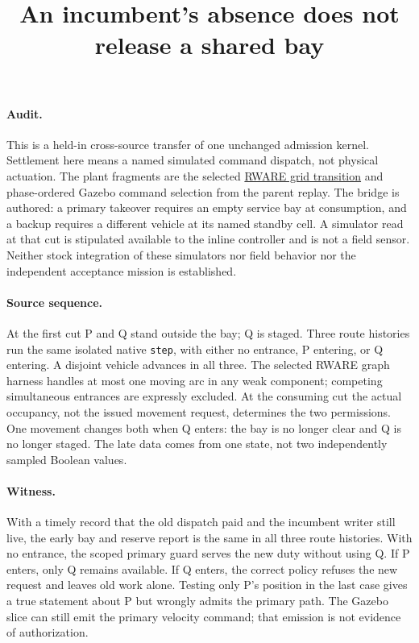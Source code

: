 \documentclass{article}
\title{An incumbent's absence does not release a shared bay}
\author{}
\date{}
\begin{document}
\maketitle
\paragraph{Audit.}
This is a held-in cross-source transfer of one unchanged admission
kernel. Settlement here means a named simulated command dispatch, not
physical actuation. The plant fragments are the selected
\href{https://github.com/semitable/robotic-warehouse/blob/96fbc64e3eae5fee915e0d390f864fa06ddccd47/rware/warehouse.py}{RWARE grid transition}
and phase-ordered Gazebo command selection from the parent replay.
The bridge is authored: a primary takeover requires an empty service
bay at consumption, and a backup requires a different vehicle at its
named standby cell. A simulator read at that cut is stipulated
available to the inline controller and is not a field sensor.
Neither stock integration of these simulators nor field behavior nor
the independent acceptance mission is established.

\paragraph{Source sequence.}
At the first cut P and Q stand outside the bay; Q is staged.
Three route histories run the same isolated native \texttt{step},
with either no entrance, P entering, or Q entering. A disjoint
vehicle advances in all three. The selected RWARE graph harness
handles at most one moving arc in any weak component; competing
simultaneous entrances are expressly excluded.
At the consuming cut the actual occupancy, not the issued movement
request, determines the two permissions. One movement changes both
when Q enters: the bay is no longer clear and Q is no longer staged.
The late data comes from one state, not two independently sampled
Boolean values.

\paragraph{Witness.}
With a timely record that the old dispatch paid and the incumbent
writer still live, the early bay and reserve report is the same
in all three route histories. With no entrance, the scoped primary
guard serves the new duty without using Q. If P enters, only Q
remains available. If Q enters, the correct policy refuses the new
request and leaves old work alone. Testing only P's position in the
last case gives a true statement about P but wrongly admits the
primary path. The Gazebo slice can still emit the primary velocity
command; that emission is not evidence of authorization.
\end{document}
